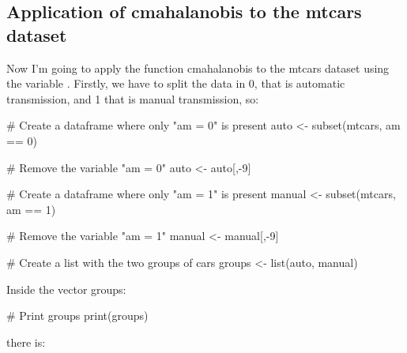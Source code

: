 \documentclass[article]{jss}
\begin{document}
\subsection{Application of cmahalanobis to the mtcars dataset}\label{Application of cmahalanobis to the mtcars dataset}
Now I'm going to apply the function cmahalanobis to the mtcars dataset using the variable . Firstly, we have to split the data in 0, that is automatic transmission, and 1 that is manual transmission, so:
\begin{CodeChunk}
\begin{CodeInput}
# Create a dataframe where only "am = 0" is present
auto <- subset(mtcars, am == 0)

# Remove the variable "am = 0"
auto <- auto[,-9]

# Create a dataframe where only "am = 1" is present
manual <- subset(mtcars, am == 1)

# Remove the variable "am = 1"
manual <- manual[,-9]

# Create a list with the two groups of cars
groups <- list(auto, manual)
\end{CodeInput}
\end{CodeChunk}

Inside the vector groups:
\begin{CodeChunk}
\begin{CodeInput}
# Print groups
print(groups)
\end{CodeInput}
\end{CodeChunk}

there is:
\end{document}
